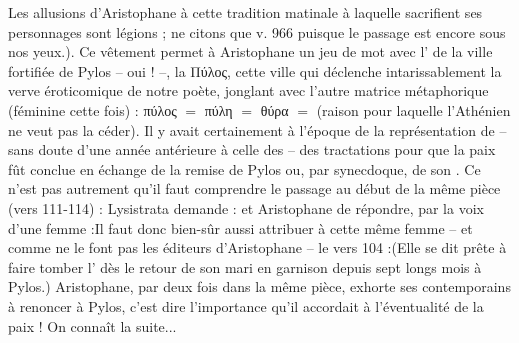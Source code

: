 {{Les allusions d'Aristophane à cette tradition matinale à laquelle sacrifient ses personnages sont légions ; ne citons que  v. 966 puisque le passage est encore sous nos yeux.}).
Ce vêtement permet à Aristophane un jeu de mot avec l' de la ville fortifiée de Pylos -- oui ! --, la Πύλος, cette ville qui déclenche intarissablement la verve éroticomique de notre poète, jonglant avec l'autre matrice métaphorique (féminine cette fois) : πύλος $=$ πύλη $=$ θύρα $=$  (raison pour laquelle l'Athénien ne veut pas la céder). 
Il y avait certainement à l'époque de la représentation de  -- sans doute d'une année antérieure à celle des  -- des tractations pour que la paix fût conclue en échange de la remise de Pylos ou, par synecdoque, de son . 
Ce n'est pas autrement qu'il faut comprendre le passage au début de la même pièce (vers 111-114) : Lysistrata demande : et Aristophane de répondre, par la voix d'une femme :Il faut donc bien-sûr aussi attribuer à cette même femme -- et comme ne le font pas les éditeurs d'Aristophane -- le vers 104 :(Elle se dit prête à faire tomber l' dès le retour de son mari en garnison depuis sept longs mois à Pylos.)
Aristophane, par deux fois dans la même pièce, exhorte ses contemporains à renoncer à Pylos, c'est dire l'importance qu'il accordait à l'éventualité de la paix ! On connaît la suite...
}
